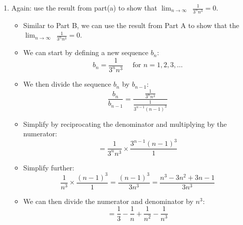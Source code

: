 \documentclass[12pt]{report}
\begin{document}
\begin{enumerate}[leftmargin=\labelsep]
\begin{enumerate}
\begin{tcolorbox}
\begin{itemize}[label={}]
                    \end{itemize}
                \end{tcolorbox}
\newpage
            \item Again: use the result from part(a) to show that $\displaystyle{\lim_{n \to \infty}}\,\,\, \frac{1}{3^nn^3}=0$.
                    \begin{tcolorbox}
                        \begin{itemize}[label={}]
                            \item Similar to Part B, we can use the result from Part A to show that the $\displaystyle{\lim_{n \to \infty}}\,\,\, \frac{1}{3^nn^3}=0$.
                            \item We can start by defining a new sequence $b_n$:
                            \begin{equation*}
                                b_n = \frac{1}{3^nn^3} \quad \text{ for } n=1,2,3,\dots
                            \end{equation*}
                            \item We then divide the sequence $b_n$ by $b_{n-1}$:
                            \begin{equation*} \frac{b_n}{b_{n-1}} = \frac{\frac{1}{3^nn^3}}{\frac{1}{3^{n-1}(n-1)^3}} 
                            \end{equation*}
                            \item Simplify by reciprocating the denominator and multiplying by the numerator:
                            \begin{equation*}
                                = \frac{1}{3^nn^3} \times \frac{3^{n-1}(n-1)^3}{1}
                            \end{equation*}
                            \item Simplify further:
                            \begin{equation*}
                               \frac{1}{n^3} \times \frac{(n-1)^3}{1} = \frac{(n-1)^3}{3n^3} = \frac{n^3-3n^2+3n-1}{3n^3} 
                            \end{equation*}
                            \item We can then divide the numerator and denominator by $n^3$:
                            \begin{equation*}
                                = \frac{1}{3} - \frac{1}{n} + \frac{1}{n^2} - \frac{1}{n^3}
                            \end{equation*}

\end{itemize}
\end{tcolorbox}
\end{enumerate}
\end{enumerate}
\end{document}
